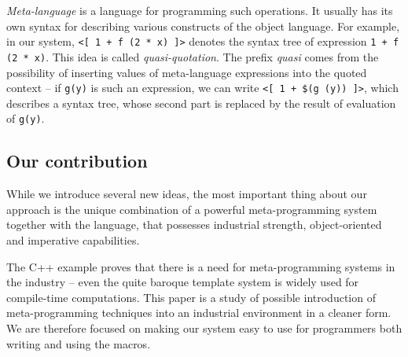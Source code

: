 \documentclass{llncs}
\begin{document}
\emph{Meta-language} is a language for programming such operations. It 
usually has its own syntax for describing various constructs of the object language.
For example, in our system, \verb,<[ 1 + f (2 * x) ]>, denotes the syntax 
tree of expression \verb,1 + f (2 * x),. This idea is called \emph{quasi-quotation}. 
The prefix \emph{quasi} comes from the possibility of inserting values 
of meta-language expressions into the quoted context -- if \verb,g(y), is such 
an expression, we can write \verb.<[ 1 + $(g (y)) ]>., %
which describes a syntax tree, whose second part is replaced by the result of 
evaluation of \verb,g(y),.

\subsection{Our contribution}
While we introduce several new ideas, the most important thing about
our approach is the unique combination of a powerful meta-programming
system together with the language, that possesses industrial strength, 
object-oriented and imperative capabilities.

The C++ example proves that there is a need for meta-programming
systems in the industry -- even the quite baroque template system is
widely used for compile-time computations. This paper is a study of
possible introduction of meta-programming techniques into an industrial
environment in a cleaner form. We are therefore focused on making our
system easy to use for programmers both writing and using the macros.
\end{document}
